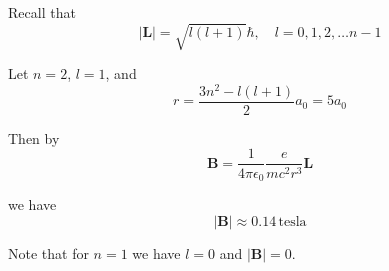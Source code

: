 



Recall that
\begin{equation*}
|\mathbf L|=\sqrt{l(l+1)}\hbar,\quad l=0,1,2,\ldots n-1
\end{equation*}

Let $n=2$, $l=1$, and
\begin{equation*}
r=\frac{3n^2-l(l+1)}{2}a_0=5a_0
\end{equation*}

Then by
\begin{equation*}
\mathbf B=\frac{1}{4\pi\epsilon_0}\frac{e}{mc^2r^3}\mathbf L
\tag{7.60}
\end{equation*}

we have
\begin{equation*}
|\mathbf B|\approx0.14\,\text{tesla}
\end{equation*}

Note that for $n=1$ we have $l=0$ and $|\mathbf B|=0$.


